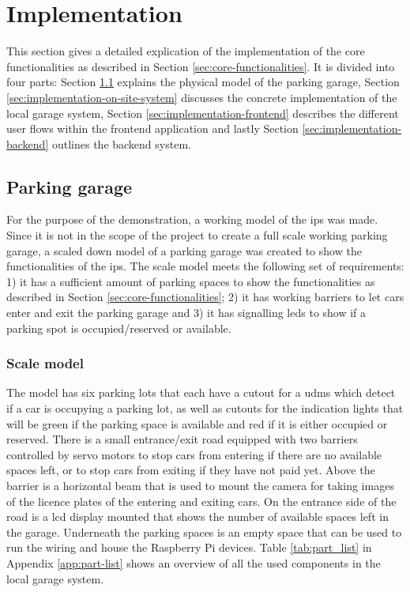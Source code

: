 \section{Implementation}\label{sec:implementation}
This section gives a detailed explication of the implementation of the core functionalities as described in Section \ref{sec:core-functionalities}. It is divided into four parts: Section \ref{sec:implementation-parking-garage} explains the physical model of the parking garage, Section \ref{sec:implementation-on-site-system} discusses the concrete implementation of the local garage system, Section \ref{sec:implementation-frontend} describes the different user flows within the frontend application and lastly Section \ref{sec:implementation-backend} outlines the backend system.


\subsection{Parking garage}\label{sec:implementation-parking-garage}
For the purpose of the  demonstration, a working model of the \ac{ips} was made. Since it is not in the scope of the project to create a full scale working parking garage, a scaled down model of a parking garage was created to show the functionalities of the \ac{ips}. The scale model meets the following set of requirements: 1) it has a sufficient amount of parking spaces to show the functionalities as described in Section \ref{sec:core-functionalities}; 2) it has working barriers to let cars enter and exit the parking garage and 3) it has signalling \acp{led} to show if a parking spot is occupied/reserved or available.

\subsubsection{Scale model}
The model has six parking lots that each have a cutout for a \ac{udms} which detect if a car is occupying a parking lot, as well as cutouts for the indication lights that will be green if the parking space is available and red if it is either occupied or reserved. There is a small entrance/exit road equipped with two barriers controlled by servo motors to stop cars from entering if there are no available spaces left, or to stop cars from exiting if they have not paid yet. Above the barrier is a horizontal beam that is used to mount the camera for taking images of the licence plates of the entering and exiting cars. On the entrance side of the road is a \ac{lcd} display mounted that shows the number of available spaces left in the garage. Underneath the parking spaces is an empty space that can be used to run the wiring and house the Raspberry Pi devices. Table \ref{tab:part_list} in Appendix \ref{app:part-list} shows an overview of all the used components in the local garage system.

